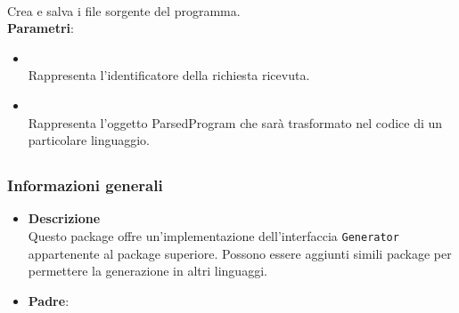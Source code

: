 \begin{itemize}
\begin{itemize}
\\ Crea e salva i file sorgente del programma.
\\ \textbf{Parametri}:
\begin{itemize}
\item {}
\\ Rappresenta l'identificatore della richiesta ricevuta.
\item {}
\\ Rappresenta l'oggetto ParsedProgram che sarà trasformato nel codice di un particolare linguaggio. 
\end{itemize}
\end{itemize}
\end{itemize}
\subsection{}
\label{\nogloxy{swedesigner::server::generator::java}}
\subsubsection{Informazioni generali}
\begin{itemize}
\item \textbf{Descrizione}\\
Questo package offre un'implementazione dell'interfaccia \texttt{Generator} appartenente al package superiore. Possono essere aggiunti simili package per permettere la generazione in altri linguaggi.
\item \textbf{Padre}: \hyperref[\nogloxy{swedesigner::server::generator}]{}
\end{itemize}
